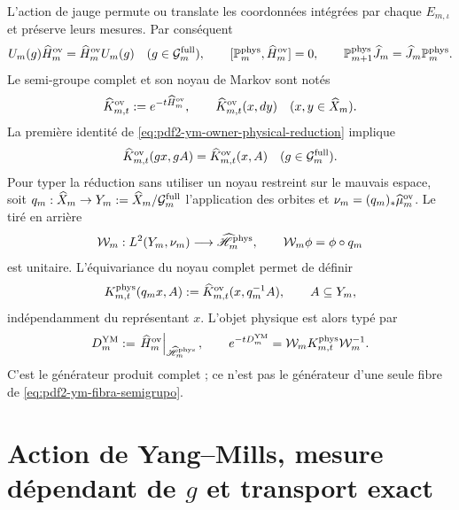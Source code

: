 L'action de jauge permute ou translate les coordonnées intégrées par chaque $E_{m,\iota}$ et préserve leurs mesures. Par conséquent
\begin{equation}\label{eq:pdf2-ym-owner-physical-reduction}
 U_m(g)\widehat H_m^{\rm ov}=\widehat H_m^{\rm ov}U_m(g)
 \quad(g\in\mathcal G_m^{\rm full}),
 \qquad
 [\mathbb P_m^{\rm phys},\widehat H_m^{\rm ov}]=0,
 \qquad
 \mathbb P_{m+1}^{\rm phys}\widehat J_m
 =\widehat J_m\mathbb P_m^{\rm phys}.
\end{equation}
Le semi-groupe complet et son noyau de Markov sont notés
\begin{equation}\label{eq:pdf2-ym-owner-full-kernel}
 \widehat K_{m,t}^{\rm ov}:=e^{-t\widehat H_m^{\rm ov}},
 \qquad
\widehat K_{m,t}^{\rm ov}(x,dy)
 \quad(x,y\in\widehat X_m).
\end{equation}
La première identité de \eqref{eq:pdf2-ym-owner-physical-reduction} implique
\begin{equation}\label{eq:pdf2-ym-owner-full-kernel-equivariance}
 \widehat K_{m,t}^{\rm ov}(gx,gA)
 =\widehat K_{m,t}^{\rm ov}(x,A)
 \quad(g\in\mathcal G_m^{\rm full}).
\end{equation}
Pour typer la réduction sans utiliser un noyau restreint sur le mauvais espace,
soit $q_m:\widehat X_m\to Y_m:=\widehat X_m/\mathcal G_m^{\rm full}$ l’application des
orbites et $\nu_m=(q_m)_*\widehat\mu_m^{\rm ov}$. Le tiré en arrière
\begin{equation}\label{eq:pdf2-ym-owner-quotient-unitary}
 \mathcal W_m:L^2(Y_m,\nu_m)\longrightarrow
 \widehat{\mathscr H}_m^{\rm phys},
 \qquad \mathcal W_m\phi=\phi\circ q_m
\end{equation}
est unitaire. L'équivariance du noyau complet permet de définir
\begin{equation}\label{eq:pdf2-ym-owner-physical-kernel}
 K_{m,t}^{\rm phys}(q_mx,A)
 :=\widehat K_{m,t}^{\rm ov}(x,q_m^{-1}A),
 \qquad A\subseteq Y_m,
\end{equation}
indépendamment du représentant $x$. L’objet physique est alors typé par
\begin{equation}\label{eq:pdf2-ym-owner-D}
 D_m^{\rm YM}
 :=\left.\widehat H_m^{\rm ov}\right|_{\widehat{\mathscr H}_m^{\rm phys}},
 \qquad
 e^{-tD_m^{\rm YM}}
 =\mathcal W_mK_{m,t}^{\rm phys}\mathcal W_m^{-1}.
\end{equation}
C'est le générateur produit complet ; ce n'est pas le générateur d'une seule fibre de \eqref{eq:pdf2-ym-fibra-semigrupo}.

\section{Action de Yang--Mills, mesure dépendant de $g$ et transport exact}

